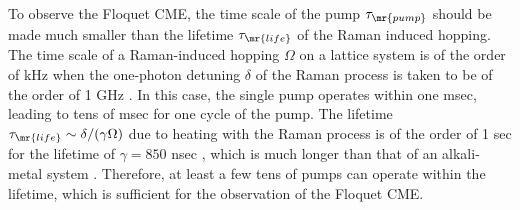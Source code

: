 \documentclass[
floatfix,
pra,
twocolumn,
reprint,
amsmath,amssymb,
aps,
footnote,
]{revtex4}
\begin{document}
To observe the Floquet CME, the time scale of the pump $\tau_{\mr{pump}}$ should be made much smaller than the lifetime $\tau_{\mr{life}}$ of the Raman induced hopping.
The time scale of a Raman-induced hopping $\Omega$ on a lattice system is of the order of kHz \cite{Mancini15} when the one-photon detuning $\delta$ of the Raman process is taken to be of the order of 1 GHz \cite{BudichJ15, Song16}.
In this case, the single pump operates within one msec, leading to tens of msec for one cycle of the pump.
The lifetime $\tau_{\mr{life}} \sim \delta / (\gamma \Omega)$ due to heating with the Raman process is of the order of 1 sec for the lifetime of $\gamma = 850$ nsec \cite{Enomoto08}, which is much longer than that of an alkali-metal system \cite{Song16}.
Therefore, at least a few tens of pumps can operate within the lifetime, which is sufficient for the observation of the Floquet CME.












\end{document}

